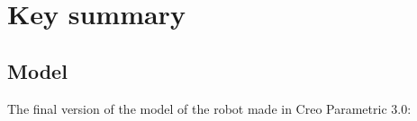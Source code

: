 \section{Key summary}

\subsection{Model}
The final version of the model of the robot made in Creo Parametric 3.0:
\begin{figure}[H]
	\begin{minipage}[h]{1\linewidth}
	\end{minipage}
\end{figure}
\begin{figure}[H]
	\begin{minipage}[h]{1\linewidth}
	\end{minipage}
\end{figure}
\newpage

